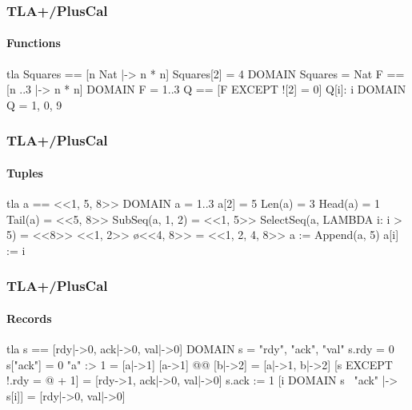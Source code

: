 \documentclass[
  11pt,aspectratio=169,pdf,hyperref={unicode,colorlinks=false}
]{beamer}
\begin{document}
\begin{frame}[t,fragile]
  \frametitle{TLA+/PlusCal}
  \framesubtitle{Functions}
  \begin{code}{tla}
    Squares == [n \in Nat |-> n * n]
    Squares[2] = 4
    DOMAIN Squares = Nat
    F == [n ..3 |-> n * n]
    DOMAIN F = 1..3
    Q == [F EXCEPT ![2] = 0]
    {Q[i]: i \in DOMAIN Q} = {1, 0, 9}
  \end{code}
\end{frame}

\begin{frame}[t,fragile]
  \frametitle{TLA+/PlusCal}
  \framesubtitle{Tuples}
  \begin{code}{tla}
    a == <<1, 5, 8>>
    DOMAIN a = 1..3
    a[2] = 5
    Len(a) = 3
    Head(a) = 1
    Tail(a) = <<5, 8>>
    SubSeq(a, 1, 2) = <<1, 5>>
    SelectSeq(a, LAMBDA i: i > 5) = <<8>>
    <<1, 2>> \o <<4, 8>> = <<1, 2, 4, 8>>
    a := Append(a, 5)
    a[i] := i
  \end{code}
\end{frame}

\begin{frame}[t,fragile]
  \frametitle{TLA+/PlusCal}
  \framesubtitle{Records}
  \begin{code}{tla}
    s == [rdy|->0, ack|->0, val|->0]
    DOMAIN s = {"rdy", "ack", "val"}
    s.rdy = 0
    s["ack"] = 0
    "a" :> 1 = [a|->1]
    [a->1] @@ [b|->2] = [a|->1, b|->2]
    [s EXCEPT !.rdy = @ + 1] = [rdy->1, ack|->0, val|->0]
    s.ack := 1
    [i \in DOMAIN s \ {"ack"} |-> s[i]] = [rdy|->0, val|->0]
  \end{code}
\end{frame}
\end{document}

